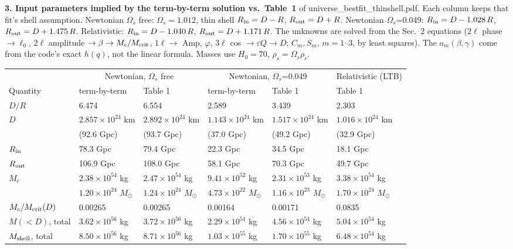 \documentclass[10pt]{article}
\begin{document}
{\textbf{3. Input parameters implied by the term-by-term solution vs.\ Table~1} of universe\_bestfit\_thinshell.pdf. Each column keeps that fit's shell assumption. Newtonian $\Omega_s$ free: $\Omega_s=1.012$, thin shell $R_{\rm in}=D-R$, $R_{\rm out}=D+R$. Newtonian $\Omega_s$=0.049: $R_{\rm in}=D-1.028\,R$, $R_{\rm out}=D+1.475\,R$. Relativistic: $R_{\rm in}=D-1.040\,R$, $R_{\rm out}=D+1.171\,R$. The unknowns are solved from the Sec.~2 equations ($2\ell$ phase $\to\ell_0$, $2\ell$ amplitude $\to\beta\to M_c/M_{\rm crit}$, $1\ell\to$ Amp, $\varphi$, $3\ell$ cos $\to\varepsilon Q\to D$; $C_m,S_m$, $m=1$--3, by least squares). The $a_m(\beta,\gamma)$ come from the code's exact $h(q)$, not the linear formula. Masses use $H_0=70$, $\rho_s=\Omega_s\rho_c$.
\begin{center}\footnotesize\setlength{\tabcolsep}{4.5pt}\begin{tabular}{llllll}\toprule
 & \multicolumn{2}{c}{Newtonian, $\Omega_s$ free} & \multicolumn{2}{c}{Newtonian, $\Omega_s$=0.049} & Relativistic (LTB)\\
Quantity & term-by-term & Table 1 & term-by-term & Table 1 & Table 1\\\midrule
$D/R$ & 6.474 & 6.554 & 2.589 & 3.439 & 2.303\\
$D$ & $2.857{\times}10^{24}$ km & $2.892{\times}10^{24}$ km & $1.143{\times}10^{24}$ km & $1.517{\times}10^{24}$ km & $1.016{\times}10^{24}$ km\\
 & (92.6 Gpc) & (93.7 Gpc) & (37.0 Gpc) & (49.2 Gpc) & (32.9 Gpc)\\
$R_{\rm in}$ & 78.3 Gpc & 79.4 Gpc & 22.3 Gpc & 34.5 Gpc & 18.1 Gpc\\
$R_{\rm out}$ & 106.9 Gpc & 108.0 Gpc & 58.1 Gpc & 70.3 Gpc & 49.7 Gpc\\
$M_c$ & $2.38{\times}10^{54}$ kg & $2.47{\times}10^{54}$ kg & $9.41{\times}10^{52}$ kg & $2.31{\times}10^{53}$ kg & $3.38{\times}10^{54}$ kg\\
 & $1.20{\times}10^{24}$ $M_\odot$ & $1.24{\times}10^{24}$ $M_\odot$ & $4.73{\times}10^{22}$ $M_\odot$ & $1.16{\times}10^{23}$ $M_\odot$ & $1.70{\times}10^{24}$ $M_\odot$\\
$M_c/M_{\rm crit}(D)$ & 0.00265 & 0.00265 & 0.00164 & 0.00171 & 0.0835\\
$M(<D)$, total & $3.62{\times}10^{56}$ kg & $3.72{\times}10^{56}$ kg & $2.29{\times}10^{54}$ kg & $4.56{\times}10^{54}$ kg & $5.04{\times}10^{54}$ kg\\
$M_{\rm shell}$, total & $8.50{\times}10^{56}$ kg & $8.71{\times}10^{56}$ kg & $1.03{\times}10^{55}$ kg & $1.70{\times}10^{55}$ kg & $6.48{\times}10^{54}$ kg\\

\end{tabular}
\end{center}}
\end{document}

